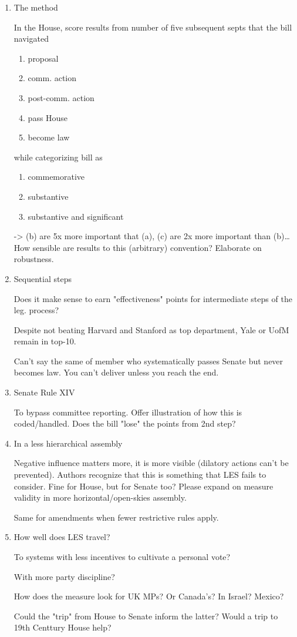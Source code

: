 \documentclass{article}
\begin{document}
\begin{enumerate}
\item The method
\label{sec:orgcab74e9}

In the House, score results from number of five subsequent septs that the bill navigated

\begin{enumerate}
\item proposal
\item comm. action
\item post-comm. action
\item pass House
\item become law
\end{enumerate}

while categorizing bill as

\begin{enumerate}
\item commemorative
\item substantive
\item substantive and significant
\end{enumerate}

-> (b) are 5x more important that (a), (c) are 2x more important than (b)\ldots{} How sensible are results to this (arbitrary) convention? Elaborate on robustness.

\item Sequential steps
\label{sec:orgd7abba1}

Does it make sense to earn "effectiveness" points for intermediate steps of the leg. process? 

Despite not beating Harvard and Stanford as top department, Yale or UofM remain in top-10. 

Can't say the same of member who systematically passes Senate but never becomes law. You can't deliver unless you reach the end.

\item Senate Rule XIV
\label{sec:orgaa0d442}

To bypass committee reporting. Offer illustration of how this is coded/handled. Does the bill "lose" the points from 2nd step?

\item In a less hierarchical assembly
\label{sec:orgc9b9965}

Negative influence matters more, it is more visible (dilatory actions can't be prevented). Authors recognize that this is something that LES fails to consider. Fine for House, but for Senate too? Please expand on measure validity in more horizontal/open-skies assembly.

Same for amendments when fewer restrictive rules apply.

\item How well does LES travel?
\label{sec:org92d738e}

To systems with less incentives to cultivate a personal vote?

With more party discipline? 

How does the measure look for UK MPs? Or Canada's? In Israel? Mexico?

Could the "trip" from House to Senate inform the latter? Would a trip to 19th Centtury House help?
\end{enumerate}
\end{document}
